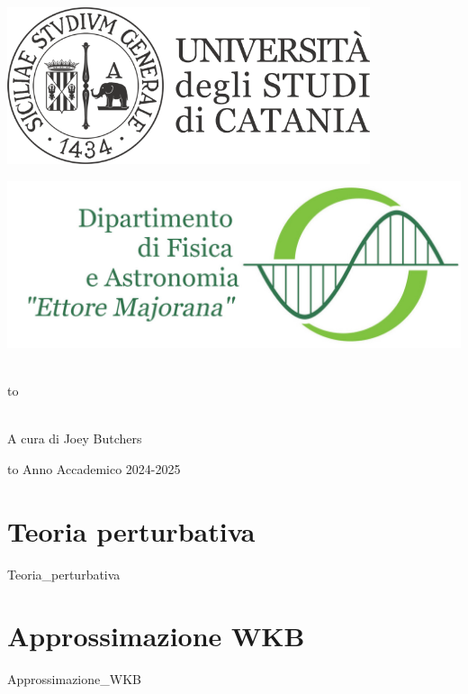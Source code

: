 \documentclass[openany,12pt]{article}
\newcommand\blankpage{%
    \null
    \thispagestyle{empty}%
    \newpage} %
\begin{document}
\thispagestyle{empty}
\begin{center}

\begin{minipage}[c]{0.45\textwidth}
\begin{flushleft}
\includegraphics[width=0.8\textwidth]{logo-unict-orizzontale-grigio.png}
\end{flushleft}
\end{minipage}
\hfill
\begin{minipage}[c]{0.45\textwidth}
\begin{flushright}
\includegraphics[width=\textwidth]{logo_dfa_orizzontale}
\end{flushright}
\end{minipage}\\
\medskip
\hbox to \textwidth{\hrulefill}

\vfill
\vfill

\uppercase{}\\


\vfill
\large{A cura di Joey Butchers}

\vfill
\vfill
\hbox to \textwidth{\hrulefill}
{\sc Anno Accademico 2024-2025}
\end{center}

\afterpage{\blankpage}
\newpage

\section{Teoria perturbativa}
{Teoria_perturbativa}

\newpage

\section{Approssimazione WKB}
{Approssimazione_WKB}

\newpage

\end{document}
